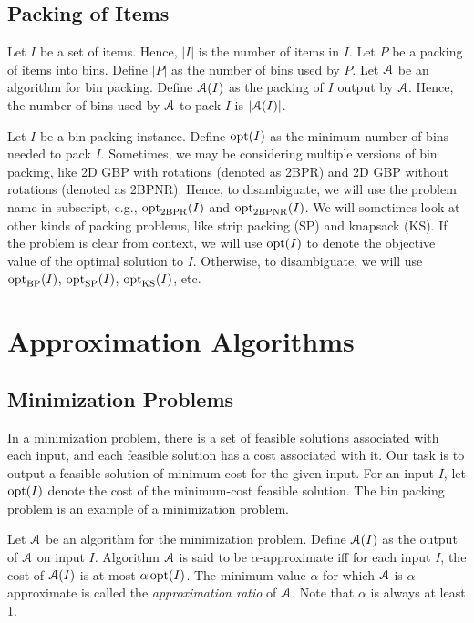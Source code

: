 \subsection{Packing of Items}

Let $I$ be a set of items. Hence, $|I|$ is the number of items in $I$.
Let $P$ be a packing of items into bins. Define $|P|$ as the number of bins used by $P$.
Let $\mathcal{A}$ be an algorithm for bin packing.
Define $\mathcal{A}(I)$ as the packing of $I$ output by $\mathcal{A}$.
Hence, the number of bins used by $\mathcal{A}$ to pack $I$ is $|\mathcal{A}(I)|$.

Let $I$ be a bin packing instance.
Define $\operatorname{opt}(I)$ as the minimum number of bins needed to pack $I$.
Sometimes, we may be considering multiple versions of bin packing,
like 2D GBP with rotations (denoted as 2BPR)
and 2D GBP without rotations (denoted as 2BPNR).
Hence, to disambiguate, we will use the problem name in subscript,
e.g., $\operatorname{opt}_{\mathrm{2BPR}}(I)$ and $\operatorname{opt}_{\mathrm{2BPNR}}(I)$.
We will sometimes look at other kinds of packing problems,
like strip packing (SP) and knapsack (KS).
If the problem is clear from context, we will use $\operatorname{opt}(I)$
to denote the objective value of the optimal solution to $I$.
Otherwise, to disambiguate, we will use $\operatorname{opt}_{\mathrm{BP}}(I)$,
$\operatorname{opt}_{\mathrm{SP}}(I)$, $\operatorname{opt}_{\mathrm{KS}}(I)$, etc.

\section{Approximation Algorithms}

\subsection{Minimization Problems}
\label{sec:appx:min}

In a minimization problem, there is a set of feasible solutions associated with each input,
and each feasible solution has a cost associated with it.
Our task is to output a feasible solution of minimum cost for the given input.
For an input $I$, let $\operatorname{opt}(I)$ denote the cost of the minimum-cost feasible solution.
The bin packing problem is an example of a minimization problem.

Let $\mathcal{A}$ be an algorithm for the minimization problem.
Define $\mathcal{A}(I)$ as the output of $\mathcal{A}$ on input $I$.
Algorithm $\mathcal{A}$ is said to be $\alpha$-approximate iff
for each input $I$, the cost of $\mathcal{A}(I)$ is at most $\alpha\operatorname{opt}(I)$.
The minimum value $\alpha$ for which $\mathcal{A}$ is $\alpha$-approximate
is called the \emph{approximation ratio} of $\mathcal{A}$.
Note that $\alpha$ is always at least 1.

